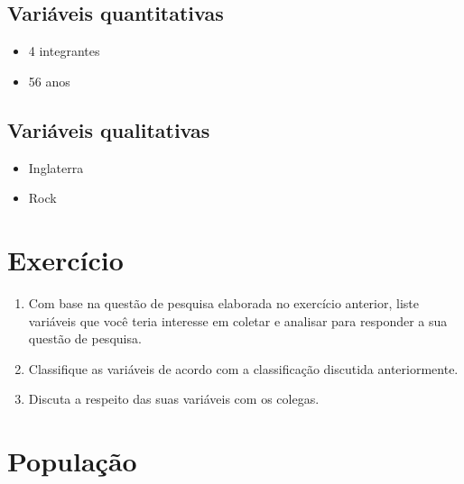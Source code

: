 \documentclass[]{tufte-book}
\providecommand{\tightlist}{%
  \setlength{\itemsep}{0pt}\setlength{\parskip}{0pt}}
\begin{document}
\hypertarget{variuxe1veis-quantitativas-2}{%
\subsection{Variáveis
quantitativas}\label{variuxe1veis-quantitativas-2}}

\begin{itemize}
\tightlist
\item
  4 integrantes
\item
  56 anos
\end{itemize}

\hypertarget{variuxe1veis-qualitativas-2}{%
\subsection{Variáveis qualitativas}\label{variuxe1veis-qualitativas-2}}

\begin{itemize}
\tightlist
\item
  Inglaterra
\item
  Rock
\end{itemize}

\hypertarget{exercuxedcio}{%
\section{Exercício}\label{exercuxedcio}}

\begin{enumerate}
\def\labelenumi{\arabic{enumi}.}
\tightlist
\item
  Com base na questão de pesquisa elaborada no exercício anterior, liste
  variáveis que você teria interesse em coletar e analisar para
  responder a sua questão de pesquisa.
\item
  Classifique as variáveis de acordo com a classificação discutida
  anteriormente.
\item
  Discuta a respeito das suas variáveis com os colegas.
\end{enumerate}

\hypertarget{populauxe7uxe3o}{%
\section{População}\label{populauxe7uxe3o}}
\end{document}
